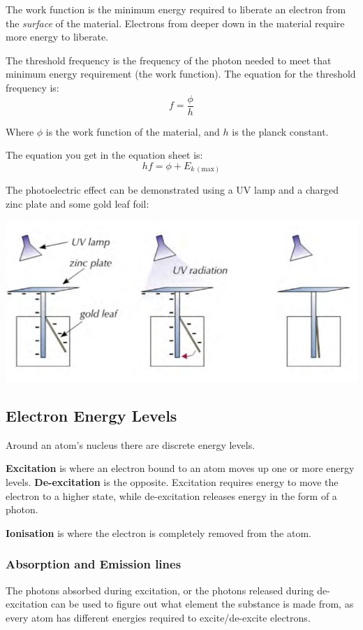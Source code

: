 \documentclass[a4paper, 12pt]{article}
\begin{document}
The work function is the minimum energy required to liberate an electron from the \textit{surface} of the material. Electrons from deeper down in the material require more energy to liberate.

The threshold frequency is the frequency of the photon needed to meet that minimum energy requirement (the work function). The equation for the threshold frequency is:
$$
f = \frac{\phi}{h}
$$

Where $\phi$ is the work function of the material, and $h$ is the planck constant.

The equation you get in the equation sheet is:
$$
hf = \phi + E_{k \, (\text{max})}
$$

The photoelectric effect can be demonstrated using a UV lamp and a charged zinc plate and some gold leaf foil:

\includegraphics[width=\textwidth]{images/photoelecExp.png}

\newpage
\subsection{Electron Energy Levels}

Around an atom's nucleus there are discrete energy levels.

\textbf{Excitation} is where an electron bound to an atom moves up one or more energy levels. \textbf{De-excitation} is the opposite. Excitation requires energy to move the electron to a higher state, while de-excitation releases energy in the form of a photon.

\textbf{Ionisation} is where the electron is completely removed from the atom.

\subsubsection{Absorption and Emission lines}

The photons absorbed during excitation, or the photons released during de-excitation can be used to figure out what element the substance is made from, as every atom has different energies required to excite/de-excite electrons.
\end{document}
